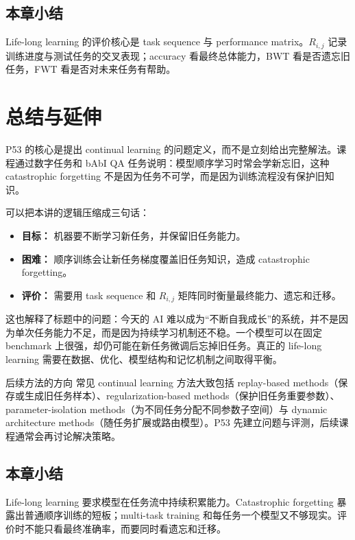 \documentclass[a4paper]{article}
\begin{document}
\subsection{本章小结}

Life-long learning 的评价核心是 task sequence 与 performance matrix。$R_{i,j}$ 记录训练进度与测试任务的交叉表现；accuracy 看最终总体能力，BWT 看是否遗忘旧任务，FWT 看是否对未来任务有帮助。

\section{总结与延伸}

P53 的核心是提出 continual learning 的问题定义，而不是立刻给出完整解法。课程通过数字任务和 bAbI QA 任务说明：模型顺序学习时常会学新忘旧，这种 catastrophic forgetting 不是因为任务不可学，而是因为训练流程没有保护旧知识。

可以把本讲的逻辑压缩成三句话：
\begin{itemize}
    \item \textbf{目标：} 机器要不断学习新任务，并保留旧任务能力。
    \item \textbf{困难：} 顺序训练会让新任务梯度覆盖旧任务知识，造成 catastrophic forgetting。
    \item \textbf{评价：} 需要用 task sequence 和 $R_{i,j}$ 矩阵同时衡量最终能力、遗忘和迁移。
\end{itemize}

这也解释了标题中的问题：今天的 AI 难以成为“不断自我成长”的系统，并不是因为单次任务能力不足，而是因为持续学习机制还不稳。一个模型可以在固定 benchmark 上很强，却仍可能在新任务微调后忘掉旧任务。真正的 life-long learning 需要在数据、优化、模型结构和记忆机制之间取得平衡。

\begin{knowledgebox}{后续方法的方向}
    常见 continual learning 方法大致包括 replay-based methods（保存或生成旧任务样本）、regularization-based methods（保护旧任务重要参数）、parameter-isolation methods（为不同任务分配不同参数子空间）与 dynamic architecture methods（随任务扩展或路由模型）。P53 先建立问题与评测，后续课程通常会再讨论解决策略。
\end{knowledgebox}

\subsection{本章小结}

Life-long learning 要求模型在任务流中持续积累能力。Catastrophic forgetting 暴露出普通顺序训练的短板；multi-task training 和每任务一个模型又不够现实。评价时不能只看最终准确率，而要同时看遗忘和迁移。
\end{document}
